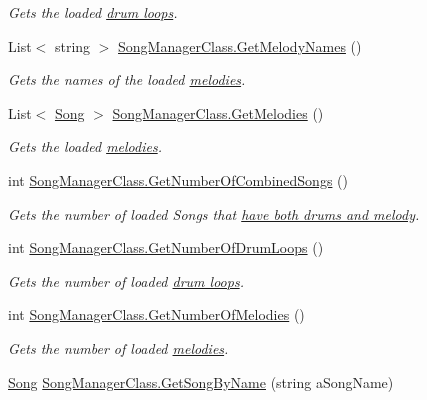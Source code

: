\begin{DoxyCompactItemize}
\begin{DoxyCompactList}\small\item\em Gets the loaded \hyperlink{group___song_group_DocSongDrumLoop}{drum loops}. \end{DoxyCompactList}\item 
List$<$ string $>$ \hyperlink{group___s_m_pub_func_ga59df8468ac771fc8eb1a5f2025e6c5a8}{Song\+Manager\+Class.\+Get\+Melody\+Names} ()
\begin{DoxyCompactList}\small\item\em Gets the names of the loaded \hyperlink{group___song_group_DocSongMelody}{melodies}. \end{DoxyCompactList}\item 
List$<$ \hyperlink{class_song}{Song} $>$ \hyperlink{group___s_m_pub_func_ga7d46ab1949725dd7c3c00ac3975916fe}{Song\+Manager\+Class.\+Get\+Melodies} ()
\begin{DoxyCompactList}\small\item\em Gets the loaded \hyperlink{group___song_group_DocSongMelody}{melodies}. \end{DoxyCompactList}\item 
int \hyperlink{group___s_m_pub_func_gac41e94dbaa3f2db83a6d86466526f76c}{Song\+Manager\+Class.\+Get\+Number\+Of\+Combined\+Songs} ()
\begin{DoxyCompactList}\small\item\em Gets the number of loaded Songs that \hyperlink{group___song_group_DocSongCombined}{have both drums and melody}. \end{DoxyCompactList}\item 
int \hyperlink{group___s_m_pub_func_ga97d32492e08ca62787088888e78589b7}{Song\+Manager\+Class.\+Get\+Number\+Of\+Drum\+Loops} ()
\begin{DoxyCompactList}\small\item\em Gets the number of loaded \hyperlink{group___song_group_DocSongDrumLoop}{drum loops}. \end{DoxyCompactList}\item 
int \hyperlink{group___s_m_pub_func_gae1d2222909f1d9a1f761591c7154f42c}{Song\+Manager\+Class.\+Get\+Number\+Of\+Melodies} ()
\begin{DoxyCompactList}\small\item\em Gets the number of loaded \hyperlink{group___song_group_DocSongMelody}{melodies}. \end{DoxyCompactList}\item 
\hyperlink{class_song}{Song} \hyperlink{group___s_m_pub_func_gafe818c55bd858c52c95a2fa7a566006a}{Song\+Manager\+Class.\+Get\+Song\+By\+Name} (string a\+Song\+Name)

\end{DoxyCompactItemize}

